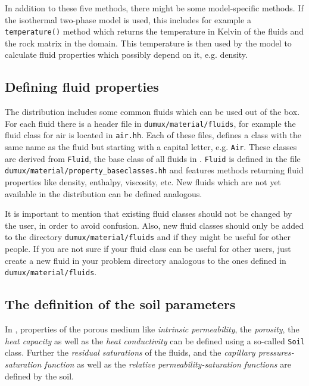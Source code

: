 In addition to these five methods, there might be some model-specific
methods. If the isothermal two-phase model is used, this includes 
for example a \texttt{temperature()} method which returns the temperature in Kelvin
of the fluids and the rock matrix in the domain. This temperature is
then used by the model to calculate fluid properties which possibly
depend on it, e.g. density.


\subsection{Defining fluid properties}\label{tutorial-coupled:description-fluid-class}

The \Dumux distribution includes some common fluids which can be used
out of the box. For each fluid there is a header file in
\texttt{dumux/material/fluids}, for example the fluid class for air is
located in \texttt{air.hh}. Each of these files, defines a class with
the same name as the fluid but starting with a capital letter,
e.g. \texttt{Air}. These classes are derived from \texttt{Fluid}, the
base class of all fluids in \Dumux. \texttt{Fluid} is defined in the
file \texttt{dumux/material/property\_baseclasses.hh} and features
methods returning fluid properties like density, enthalpy, viscosity,
etc. New fluids which are not yet available in the \Dumux distribution
can be defined analogous.

It is important to mention that existing fluid classes should not be
changed by the user, in order to avoid confusion. Also, new fluid
classes should only be added to the directory
\texttt{dumux/material/fluids} and if they might be useful for other
people. If you are not sure if your fluid class can be useful for
other \Dumux users, just create a new fluid in your problem directory
analogous to the ones defined in \texttt{dumux/material/fluids}.

\subsection{The definition of the soil parameters}\label{tutorial-coupled:description-soil-class}

In \Dumux, properties of the porous medium like \textit{intrinsic
  permeability}, the \textit{porosity}, the \textit{heat capacity} as
well as the \textit{heat conductivity} can be defined using a
so-called \texttt{Soil} class. Further the \textit{residual
  saturations} of the fluids, and the \textit{capillary
  pressures-saturation function} as well as the \textit{relative
  permeability-saturation functions} are defined by the soil.

